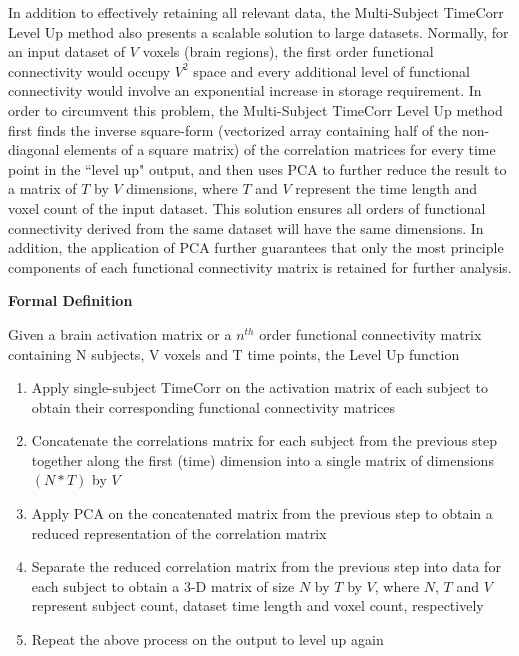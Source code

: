 \documentclass[11pt]{article}
\begin{document}
In addition to effectively retaining all relevant data, the Multi-Subject TimeCorr Level Up method also presents a scalable solution to large datasets. Normally, for an input dataset of $V$ voxels (brain regions), the first order functional connectivity would occupy $V^2$ space and every additional level of functional connectivity would involve an exponential increase in storage requirement. In order to circumvent this problem, the Multi-Subject TimeCorr Level Up method first finds the inverse square-form (vectorized array containing half of the non-diagonal elements of a square matrix) of the correlation matrices for every time point in the ``level up" output, and then uses PCA to further reduce the result to a matrix of $T$ by $V$ dimensions, where $T$ and $V$ represent the time length and voxel count of the input dataset. This solution ensures all orders of functional connectivity derived from the same dataset will have the same dimensions. In addition, the application of PCA further guarantees that only the most principle components of each functional connectivity matrix is retained for further analysis.

\large{\textbf{Formal Definition}}

\normalsize
Given a brain activation matrix or a $n^{th}$ order functional connectivity matrix containing N subjects, V voxels and T time points, the Level Up function

\begin{enumerate}
\item Apply single-subject TimeCorr on the activation matrix of each subject to obtain their corresponding functional connectivity matrices

\item Concatenate the correlations matrix for each subject from the previous step together along the first (time) dimension into a single matrix of dimensions $(N*T)$ by $V$

\item Apply PCA on the concatenated matrix from the previous step to obtain a reduced representation of the correlation matrix

\item Separate the reduced correlation matrix from the previous step into data for each subject to obtain a 3-D matrix of size $N$ by $T$ by $V$, where $N$, $T$ and $V$ represent subject count, dataset time length and voxel count, respectively

\item Repeat the above process on the output to level up again

\end{enumerate}
\end{document}
